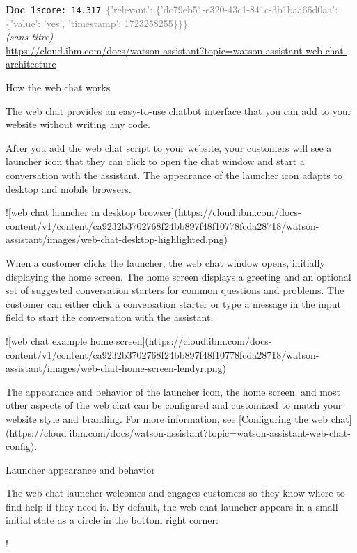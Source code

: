 \documentclass[a4paper,11pt]{article}
\begin{document}
\begin{docenv}
{\footnotesize\textcolor{doccolor}{\textbf{Doc~1}}}\hfill{\tiny\texttt{score:~14.317}}\ {\tiny\textcolor{gray}{\{'relevant': \{'dc79eb51-e320-43c1-841c-3b1baa66d0aa': \{'value': 'yes', 'timestamp': 1723258255\}\}\}}}\\[3pt]
{\small\textit{(sans titre)}}\\[2pt]
{\tiny\url{https://cloud.ibm.com/docs/watson-assistant?topic=watson-assistant-web-chat-architecture}}\\[4pt]
{\footnotesize 
How the web chat works 

The web chat provides an easy-to-use chatbot interface that you can add to your website without writing any code.

After you add the web chat script to your website, your customers will see a launcher icon that they can click to open the chat window and start a conversation with the assistant. The appearance of the launcher icon adapts to desktop and mobile browsers.

![web chat launcher in desktop browser](https://cloud.ibm.com/docs-content/v1/content/ca9232b3702768f24bb897f48f10778fcda28718/watson-assistant/images/web-chat-desktop-highlighted.png)

When a customer clicks the launcher, the web chat window opens, initially displaying the home screen. The home screen displays a greeting and an optional set of suggested conversation starters for common questions and problems. The customer can either click a conversation starter or type a message in the input field to start the conversation with the assistant.

![web chat example home screen](https://cloud.ibm.com/docs-content/v1/content/ca9232b3702768f24bb897f48f10778fcda28718/watson-assistant/images/web-chat-home-screen-lendyr.png)

The appearance and behavior of the launcher icon, the home screen, and most other aspects of the web chat can be configured and customized to match your website style and branding. For more information, see [Configuring the web chat](https://cloud.ibm.com/docs/watson-assistant?topic=watson-assistant-web-chat-config).



 Launcher appearance and behavior 

The web chat launcher welcomes and engages customers so they know where to find help if they need it. By default, the web chat launcher appears in a small initial state as a circle in the bottom right corner:

!}
\end{docenv}
\end{document}
